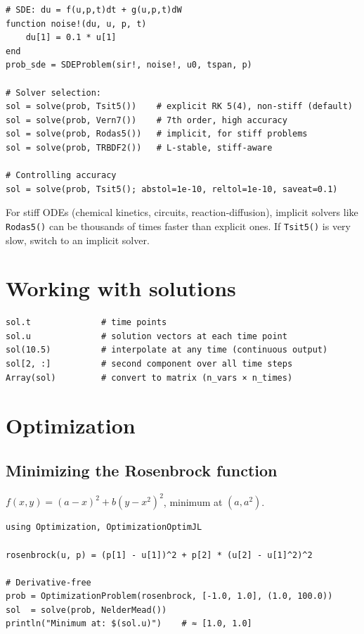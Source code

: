 \begin{verbatim}
# SDE: du = f(u,p,t)dt + g(u,p,t)dW
function noise!(du, u, p, t)
    du[1] = 0.1 * u[1]
end
prob_sde = SDEProblem(sir!, noise!, u0, tspan, p)

# Solver selection:
sol = solve(prob, Tsit5())    # explicit RK 5(4), non-stiff (default)
sol = solve(prob, Vern7())    # 7th order, high accuracy
sol = solve(prob, Rodas5())   # implicit, for stiff problems
sol = solve(prob, TRBDF2())   # L-stable, stiff-aware

# Controlling accuracy
sol = solve(prob, Tsit5(); abstol=1e-10, reltol=1e-10, saveat=0.1)
\end{verbatim}

\begin{performancetip}
For stiff ODEs (chemical kinetics, circuits, reaction-diffusion), implicit solvers like \texttt{Rodas5()} can be thousands of times faster than explicit ones. If \texttt{Tsit5()} is very slow, switch to an implicit solver.
\end{performancetip}

\section{Working with solutions}

\begin{verbatim}
sol.t              # time points
sol.u              # solution vectors at each time point
sol(10.5)          # interpolate at any time (continuous output)
sol[2, :]          # second component over all time steps
Array(sol)         # convert to matrix (n_vars × n_times)
\end{verbatim}

\section{Optimization}

\subsection{Minimizing the Rosenbrock function}

$f(x, y) = (a - x)^2 + b(y - x^2)^2$, minimum at $(a, a^2)$.

\begin{verbatim}
using Optimization, OptimizationOptimJL

rosenbrock(u, p) = (p[1] - u[1])^2 + p[2] * (u[2] - u[1]^2)^2

# Derivative-free
prob = OptimizationProblem(rosenbrock, [-1.0, 1.0], (1.0, 100.0))
sol  = solve(prob, NelderMead())
println("Minimum at: $(sol.u)")    # ≈ [1.0, 1.0]
\end{verbatim}

